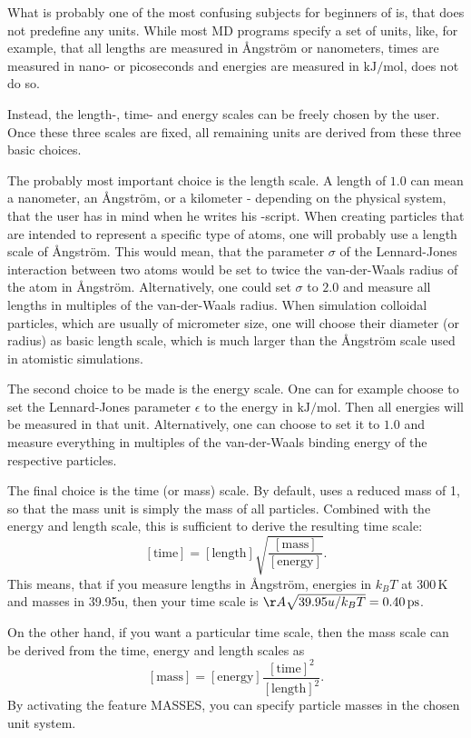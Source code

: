 What is probably one of the most confusing subjects for beginners of
\es is, that \es does not predefine any units.  While most MD programs
specify a set of units, like, for example, that all lengths are
measured in \AA ngstr\"om or nanometers, times are measured in nano-
or picoseconds and energies are measured in $\mathrm{kJ/mol}$, \es
does not do so.

Instead, the length-, time- and energy scales can be freely chosen by
the user. Once these three scales are fixed, all remaining units are
derived from these three basic choices.

The probably most important choice is the length scale.
A length of $1.0$ can mean a nanometer, an \AA ngstr\"om,
or a kilometer - depending on the physical system, that the user has
in mind when he writes his \es-script. When creating particles that are
intended to represent a specific type
of atoms, one will probably use a length scale of \AA ngstr\"om.  This
would mean, that \eg the parameter $\sigma$ of the Lennard-Jones
interaction between two atoms would be set to twice the van-der-Waals
radius of the atom in \AA ngstr\"om.  Alternatively, one could set
$\sigma$ to $2.0$ and measure all lengths in multiples of the
van-der-Waals radius. When simulation colloidal particles,
which are usually of micrometer size, one will choose their diameter
(or radius) as basic length scale, which is much larger than the 
\AA ngstr\"om scale used in atomistic simulations.
 
The second choice to be made is the energy scale.  One can
for example choose to set the Lennard-Jones parameter $\epsilon$ to
the energy in $\mathrm{kJ/mol}$.  Then all energies will be
measured in that unit.  Alternatively, one can choose to set it to
$1.0$ and measure everything in multiples of the van-der-Waals binding
energy of the respective particles.

The final choice is the time (or mass) scale. By default, \es{} uses a
reduced mass of 1, so that the mass unit is simply the mass of all
particles. Combined with the energy and length scale, this is sufficient
to derive the resulting time scale:
$$
[\mathrm{time}] = [\mathrm{length}]\sqrt{\frac{[\mathrm{mass}]}{[\mathrm{energy}]}}.
$$
This means, that if you measure lengths in \AA ngstr\"om, energies
in $k_B T$ at 300\,K and masses in 39.95u, then your time scale is
$\AA \sqrt{39.95u / k_B T} = 0.40\,\mathrm{ps}$.

On the other hand, if you want a particular time scale, then the mass
scale can be derived from the time, energy and length scales as
$$
[\mathrm{mass}] = [\mathrm{energy}]\frac{[\mathrm{time}]^2}{[\mathrm{length}]^2}.
$$
By activating the feature MASSES, you can specify particle masses
in the chosen unit system.

